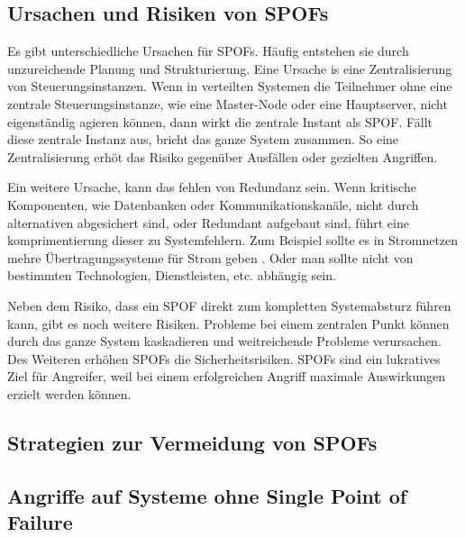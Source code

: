 \documentclass[a4paper,12pt]{article}
\begin{document}
\subsection{Ursachen und Risiken von SPOFs}

Es gibt unterschiedliche Ursachen für SPOFs. Häufig entstehen sie durch unzureichende Planung und Strukturierung. Eine Ursache is eine Zentralisierung von Steuerungsinstanzen. Wenn in verteilten Systemen die Teilnehmer ohne eine zentrale Steuerungsinstanze, wie eine Master-Node oder eine Hauptserver, nicht eigenständig agieren können, dann wirkt die zentrale Instant als SPOF. Fällt diese zentrale Instanz aus, bricht das ganze System zusammen. So eine Zentralisierung erhöt das Risiko gegenüber Ausfällen oder gezielten Angriffen.

Ein weitere Ursache, kann das fehlen von Redundanz sein. Wenn kritische Komponenten, wie Datenbanken oder Kommunikationskanäle, nicht durch alternativen abgesichert sind, oder Redundant aufgebaut sind, führt eine komprimentierung dieser zu Systemfehlern. Zum Beispiel sollte es in Stromnetzen mehre Übertragungssysteme für Strom geben \cite[S. 61f.]{Jarass2009}. Oder man sollte nicht von bestimmten Technologien, Dienstleisten, etc. abhängig sein. 

Neben dem Risiko, dass ein SPOF direkt zum kompletten Systemabsturz führen kann, gibt es noch weitere Risiken. Probleme bei einem zentralen Punkt können durch das ganze System kaskadieren und weitreichende Probleme verursachen. Des Weiteren erhöhen SPOFs die Sicherheitsrisiken. SPOFs sind ein lukratives Ziel für Angreifer, weil bei einem erfolgreichen Angriff maximale Auswirkungen erzielt werden können.

\subsection{Strategien zur Vermeidung von SPOFs}

\subsection{Angriffe auf Systeme ohne Single Point of Failure}



\end{document}

